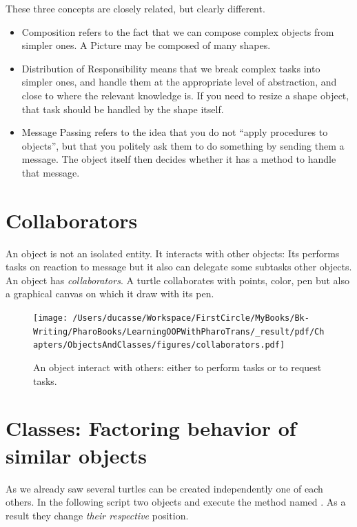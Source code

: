 \documentclass[10pt,twoside,english]{_support/latex/sbabook/sbabook}
\begin{document}
These three concepts are closely related, but clearly different.

\begin{itemize}
\item Composition refers to the fact that we can compose complex objects from simpler ones. A Picture may be composed of many shapes.
\item Distribution of Responsibility means that we break complex tasks into simpler ones, and handle them at the appropriate level of abstraction, and close to where the relevant knowledge is. If you need to resize a shape object, that task should be handled by the shape itself.
\item Message Passing refers to the idea that you do not “apply procedures to objects”, but that you politely ask them to do something by sending them a message. The object itself then decides whether it has a method to handle that message.
\end{itemize}
\section{Collaborators}
An object is not an isolated entity. It interacts with other objects: Its performs tasks on reaction to message but it also can delegate some subtasks other objects. An object has \textit{collaborators}. A turtle collaborates with points, color, pen but also a graphical canvas on which it draw with its pen. 


\begin{figure}

\begin{center}
\texttt{[image: /Users/ducasse/Workspace/FirstCircle/MyBooks/Bk-Writing/PharoBooks/LearningOOPWithPharoTrans/\_result/pdf/Chapters/ObjectsAndClasses/figures/collaborators.pdf]}\caption{An object interact with others: either to perform tasks or to request tasks.\label{fig:collaborators}}\end{center}
\end{figure}

\section{Classes: Factoring behavior of similar objects}
As we already saw several turtles can be created independently one of each others.  In the following script two  objects  and  execute the method named . As a result they change \textit{their respective} position.
\end{document}
